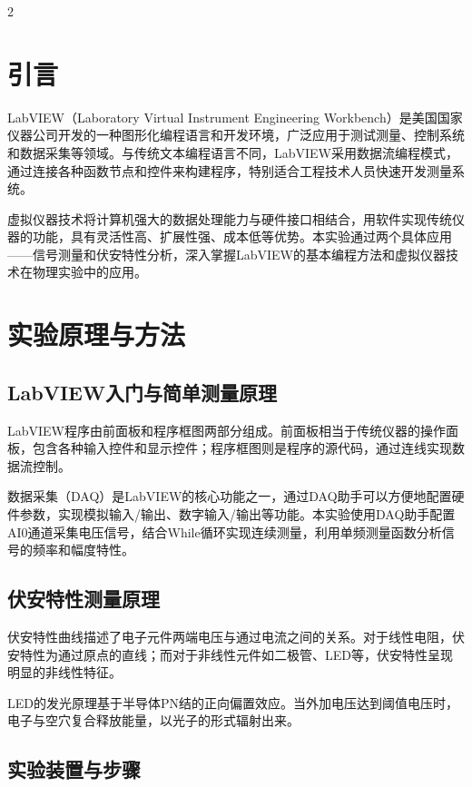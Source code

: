 \documentclass[12pt,a4paper]{article}
\begin{document}
\begin{multicols}{2}

    \section*{\heiti 引言}
    \songti
    \setlength{\parindent}{2em}

    LabVIEW（Laboratory Virtual Instrument Engineering Workbench）是美国国家仪器公司开发的一种图形化编程语言和开发环境，广泛应用于测试测量、控制系统和数据采集等领域。与传统文本编程语言不同，LabVIEW采用数据流编程模式，通过连接各种函数节点和控件来构建程序，特别适合工程技术人员快速开发测量系统。

    虚拟仪器技术将计算机强大的数据处理能力与硬件接口相结合，用软件实现传统仪器的功能，具有灵活性高、扩展性强、成本低等优势。本实验通过两个具体应用——信号测量和伏安特性分析，深入掌握LabVIEW的基本编程方法和虚拟仪器技术在物理实验中的应用。

    \section{\heiti 实验原理与方法}
    \subsection{\heiti LabVIEW入门与简单测量原理}
    \songti
    LabVIEW程序由前面板和程序框图两部分组成。前面板相当于传统仪器的操作面板，包含各种输入控件和显示控件；程序框图则是程序的源代码，通过连线实现数据流控制。

    数据采集（DAQ）是LabVIEW的核心功能之一，通过DAQ助手可以方便地配置硬件参数，实现模拟输入/输出、数字输入/输出等功能。本实验使用DAQ助手配置AI0通道采集电压信号，结合While循环实现连续测量，利用单频测量函数分析信号的频率和幅度特性。

    \subsection{\heiti 伏安特性测量原理}
    \songti
    伏安特性曲线描述了电子元件两端电压与通过电流之间的关系。对于线性电阻，伏安特性为通过原点的直线；而对于非线性元件如二极管、LED等，伏安特性呈现明显的非线性特征。

    LED的发光原理基于半导体PN结的正向偏置效应。当外加电压达到阈值电压时，电子与空穴复合释放能量，以光子的形式辐射出来。

    \subsection{\heiti 实验装置与步骤}
    \songti

\end{multicols}
\end{document}
